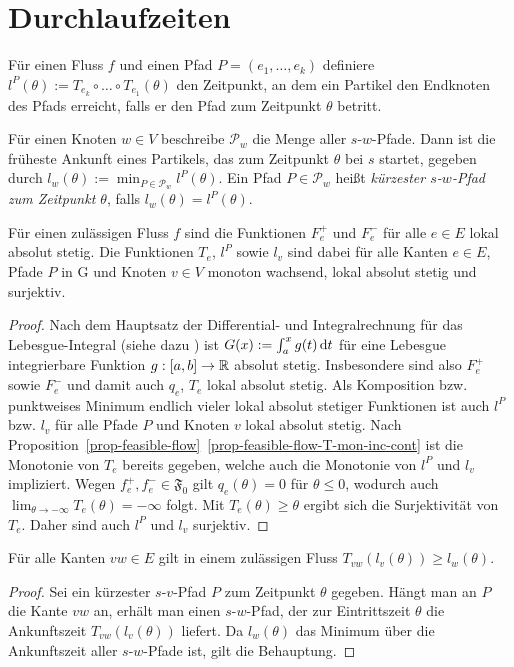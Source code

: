 \section{Durchlaufzeiten}\label{sec-travel-times}

\begin{definition}
	Für einen Fluss $f$ und einen Pfad $P=(e_1,\dots,e_k)$ definiere $l^P(\theta):=T_{e_k}\circ\dots\circ T_{e_1}(\theta)$ den Zeitpunkt, an dem ein Partikel den Endknoten des Pfads erreicht, falls er den Pfad zum Zeitpunkt $\theta$ betritt.
	
	Für einen Knoten $w\in V$ beschreibe $\mathcal{P}_w$ die Menge aller $s$-$w$-Pfade.
	Dann ist die früheste Ankunft eines Partikels, das zum Zeitpunkt $\theta$ bei $s$ startet, gegeben durch $l_w(\theta):=\min_{P\in\mathcal{P}_w}l^P(\theta)$.
	Ein Pfad $P\in \mathcal{P}_w$ heißt \emph{kürzester $s$-$w$-Pfad zum Zeitpunkt $\theta$}, falls $l_w(\theta)=l^P(\theta)$.
\end{definition}

\begin{proposition}\label{prop-abs-cont-sur}
	Für einen zulässigen Fluss $f$ sind die Funktionen $F_e^+$ und $F_e^-$ für alle $e\in E$ lokal absolut stetig.
	Die Funktionen $T_e$, $l^P$ sowie $l_v$ sind dabei für alle Kanten $e\in E$, Pfade $P$ in G und Knoten $v\in V$ monoton wachsend, lokal absolut stetig und surjektiv.
\end{proposition}
\begin{proof}
	Nach dem Hauptsatz der Differential- und Integralrechnung für das Lebesgue-Integral (siehe dazu \cite[Satz 4.14]{Elstrodt2011Abs}) ist $G(x):= \int_a^x g(t) \mathop{}\!\mathrm{d} t$ für eine Lebesgue integrierbare Funktion $g: [a,b] \to \mathbb{R}$ absolut stetig.
	Insbesondere sind also $F_e^+$ sowie $F_e^-$ und damit auch $q_e$, $T_e$ lokal absolut stetig.
	Als Komposition bzw. punktweises Minimum endlich vieler lokal absolut stetiger Funktionen ist auch $l^P$ bzw. $l_v$ für alle Pfade $P$ und Knoten $v$ lokal absolut stetig.
	Nach Proposition~\ref{prop-feasible-flow}~\ref{prop-feasible-flow-T-mon-inc-cont} ist die Monotonie von $T_e$ bereits gegeben, welche auch die Monotonie von $l^P$ und $l_v$ impliziert.
	Wegen $f_e^+, f_e^-\in\mathfrak{F_0}$ gilt $q_e(\theta)=0$ für $\theta\leq 0$, wodurch auch $\lim_{\theta\to-\infty} T_e(\theta) = - \infty$ folgt.
	Mit $T_e(\theta)\geq \theta$ ergibt sich die Surjektivität von $T_e$.
	Daher sind auch $l^P$ und $l_v$ surjektiv.
\end{proof}

\begin{lemma}\label{lemma-dreicksungl}
	Für alle Kanten $vw\in E$ gilt in einem zulässigen Fluss 
	$T_{vw}(l_v(\theta)) \geq l_w(\theta)$.
\end{lemma}
\begin{proof}
	Sei ein kürzester $s$-$v$-Pfad $P$ zum Zeitpunkt $\theta$ gegeben.
	Hängt man an $P$ die Kante $vw$ an, erhält man einen $s$-$w$-Pfad, der zur Eintrittszeit $\theta$ die Ankunftszeit $T_{vw}(l_v(\theta))$ liefert.
	Da $l_w(\theta)$ das Minimum über die Ankunftszeit aller $s$-$w$-Pfade ist, gilt die Behauptung.
\end{proof}

